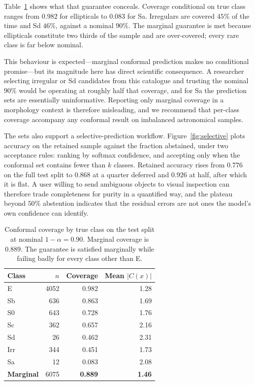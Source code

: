 \documentclass[11pt]{article}
\begin{document}
Table~\ref{tab:coverage} shows what that guarantee conceals. Coverage
conditional on true class ranges from $0.982$ for ellipticals to $0.083$ for
Sa. Irregulars are covered $45\%$ of the time and Sd $46\%$, against a nominal
$90\%$. The marginal guarantee is met because ellipticals constitute two
thirds of the sample and are over-covered; every rare class is far below
nominal.

This behaviour is expected---marginal conformal prediction makes no
conditional promise---but its magnitude here has direct scientific
consequence. A researcher selecting irregular or Sd candidates from this
catalogue and trusting the nominal $90\%$ would be operating at roughly half
that coverage, and for Sa the prediction sets are essentially uninformative.
Reporting only marginal coverage in a morphology context is therefore
misleading, and we recommend that per-class coverage accompany any conformal
result on imbalanced astronomical samples.

The sets also support a selective-prediction workflow.
Figure~\ref{fig:selective} plots accuracy on the retained sample against the
fraction abstained, under two acceptance rules: ranking by softmax confidence,
and accepting only when the conformal set contains fewer than $k$ classes.
Retained accuracy rises from $0.776$ on the full test split to $0.868$ at a
quarter deferred and $0.926$ at half, after which it is flat. A user willing
to send ambiguous objects to visual inspection can therefore trade
completeness for purity in a quantified way, and the plateau beyond $50\%$
abstention indicates that the residual errors are not ones the model's own
confidence can identify.

\begin{table}[htbp]
\centering
\caption{Conformal coverage by true class on the test split at nominal
$1-\alpha = 0.90$. Marginal coverage is $0.889$. The guarantee is satisfied
marginally while failing badly for every class other than E.}
\label{tab:coverage}
\begin{tabular}{lrrr}
\toprule
Class & $n$ & Coverage & Mean $|C(x)|$ \\
\midrule
E   & 4052 & 0.982 & 1.28 \\
Sb  &  636 & 0.863 & 1.69 \\
S0  &  643 & 0.728 & 1.76 \\
Sc  &  362 & 0.657 & 2.16 \\
Sd  &   26 & 0.462 & 2.31 \\
Irr &  344 & 0.451 & 1.73 \\
Sa  &   12 & 0.083 & 2.08 \\
\midrule
\textbf{Marginal} & 6075 & \textbf{0.889} & \textbf{1.46} \\
\bottomrule
\end{tabular}
\end{table}
\end{document}
